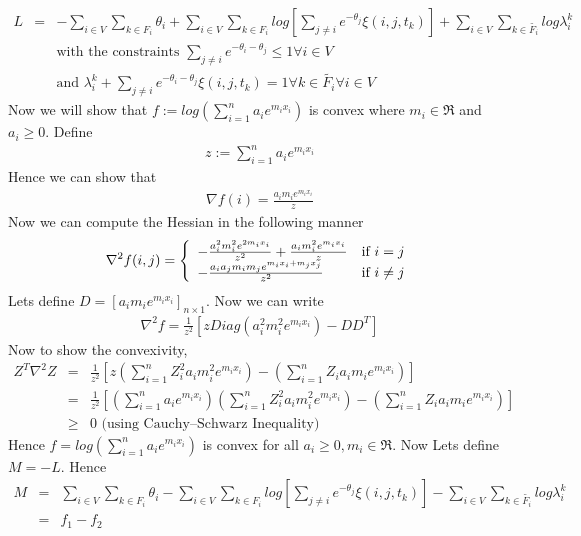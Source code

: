 \begin{eqnarray*}
L  	&=&	-\displaystyle\sum_{i \in V}\displaystyle\sum_{k \in F_i}\theta_i+\displaystyle\sum_{i \in 						V}\displaystyle\sum_{k \in F_i}log[\displaystyle\sum_{j \neq i} e^{-\theta_j}\xi 									(i,j,t_k)]+\displaystyle\sum_{i \in V}\displaystyle\sum_{k \in \widetilde{F_{i}}}log\lambda_{i}^{k}\\
	&& {} \mbox{with the constraints } \displaystyle\sum_{j \neq i}e^{-\theta_i-\theta_j} \leq 1 \forall i \in 			V\\
	&& {} \mbox{and } \lambda_{i}^{k} + \displaystyle\sum_{j \neq i}e^{-\theta_i-\theta_j}\xi(i,j,t_k) = 1 				  \forall k \in \widetilde{F_i} \forall i\in V 
\end{eqnarray*}
Now we will show that $f := log(\displaystyle\sum_{i=1}^{n}a_ie^{m_ix_i})$ is convex where $m_i \in \Re$ and $a_i \geq 0$. Define
\begin{eqnarray*}
z := \displaystyle\sum_{i=1}^{n}a_ie^{m_ix_i}
\end{eqnarray*}
Hence we can show that
\begin{eqnarray*}
\nabla f (i) = \frac{a_im_ie^{m_ix_i}}{z}
\end{eqnarray*}
Now we can compute the Hessian in the following manner
\begin{eqnarray*}
\nabla^2 f(i,j) = \left\{ \begin{array}{ll} -\frac{a_{i}^{2}m_{i}^2e^{2m_ix_i}}{z^2} + \frac{a_im_i^2e^{m_ix_i}}{z} & \mbox{if } i = j \\ -\frac{a_ia_jm_im_je^{m_ix_i+m_jx_j}}{z^2} & \mbox{if } i \neq j \end{array} \right.
\end{eqnarray*}
Lets define $D = [a_im_ie^{m_ix_i}]_{n \times 1}$. Now we can write 
\begin{eqnarray*}
\nabla^2 f = \frac{1}{z^2}[zDiag(a_i^2m_i^2e^{m_ix_i})-DD^T]
\end{eqnarray*}
Now to show the convexivity,
\begin{eqnarray*}
Z^T \nabla^2 Z &=& \frac{1}{z^2}[z(\displaystyle\sum_{i=1}^{n} 																		Z_i^2a_im_i^2e^{m_ix_i})-(\displaystyle\sum_{i=1}^{n}Z_ia_im_ie^{m_ix_i})] \\
			   &=& \frac{1}{z^2}[(\displaystyle\sum_{i=1}^{n}a_ie^{m_ix_i})(\displaystyle\sum_{i=1}^{n} 							Z_i^2a_im_i^2e^{m_ix_i}) - (\displaystyle\sum_{i=1}^{n}Z_ia_im_ie^{m_ix_i})] \\
			    &\geq& 0 \mbox{ (using Cauchy–Schwarz Inequality)}
\end{eqnarray*}
Hence $f = log(\displaystyle\sum_{i=1}^{n}a_ie^{m_ix_i})$ is convex for all $a_i \geq 0,m_i \in \Re$. Now Lets define $M = -L$. Hence 
\begin{eqnarray*}
M &=& \displaystyle\sum_{i \in V}\displaystyle\sum_{k \in F_i}\theta_i-\displaystyle\sum_{i \in 						V}\displaystyle\sum_{k \in F_i}log[\displaystyle\sum_{j \neq i} e^{-\theta_j}\xi 									(i,j,t_k)]-\displaystyle\sum_{i \in V}\displaystyle\sum_{k \in \widetilde{F_{i}}}log\lambda_{i}^{k} \\
	&=& f_1 - f_2 
\end{eqnarray*}
